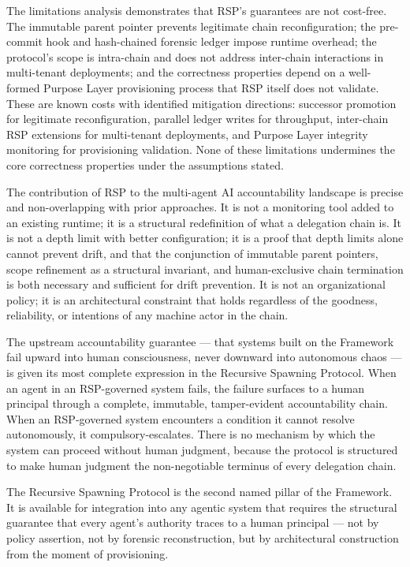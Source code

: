 The limitations analysis demonstrates that RSP's guarantees are not cost-free. The immutable parent pointer prevents legitimate chain reconfiguration; the pre-commit hook and hash-chained forensic ledger impose runtime overhead; the protocol's scope is intra-chain and does not address inter-chain interactions in multi-tenant deployments; and the correctness properties depend on a well-formed Purpose Layer provisioning process that RSP itself does not validate. These are known costs with identified mitigation directions: successor promotion for legitimate reconfiguration, parallel ledger writes for throughput, inter-chain RSP extensions for multi-tenant deployments, and Purpose Layer integrity monitoring for provisioning validation. None of these limitations undermines the core correctness properties under the assumptions stated.

The contribution of RSP to the multi-agent AI accountability landscape is precise and non-overlapping with prior approaches. It is not a monitoring tool added to an existing runtime; it is a structural redefinition of what a delegation chain is. It is not a depth limit with better configuration; it is a proof that depth limits alone cannot prevent drift, and that the conjunction of immutable parent pointers, scope refinement as a structural invariant, and human-exclusive chain termination is both necessary and sufficient for drift prevention. It is not an organizational policy; it is an architectural constraint that holds regardless of the goodness, reliability, or intentions of any machine actor in the chain.

The upstream \bxthree accountability guarantee — that systems built on the \bxthree Framework fail upward into human consciousness, never downward into autonomous chaos — is given its most complete expression in the Recursive Spawning Protocol. When an agent in an RSP-governed system fails, the failure surfaces to a human principal through a complete, immutable, tamper-evident accountability chain. When an RSP-governed system encounters a condition it cannot resolve autonomously, it compulsory-escalates. There is no mechanism by which the system can proceed without human judgment, because the protocol is structured to make human judgment the non-negotiable terminus of every delegation chain.

The Recursive Spawning Protocol is the second named pillar of the \bxthree Framework. It is available for integration into any agentic system that requires the structural guarantee that every agent's authority traces to a human principal — not by policy assertion, not by forensic reconstruction, but by architectural construction from the moment of provisioning.
